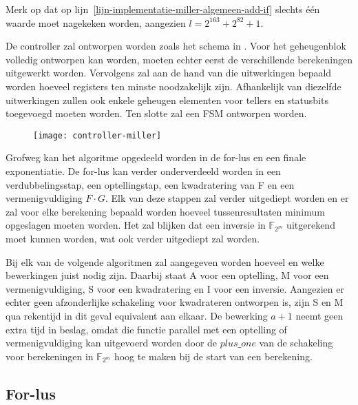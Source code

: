 Merk op dat op lijn~\ref{lijn-implementatie-miller-algemeen-add-if} slechts \'e\'en waarde moet nagekeken worden, aangezien $l = 2^{163} + 2^{82} + 1$.

De controller zal ontworpen worden zoals het schema in . Voor het geheugenblok volledig ontworpen kan worden, moeten echter eerst de verschillende berekeningen uitgewerkt worden. Vervolgens zal aan de hand van die uitwerkingen bepaald worden hoeveel registers ten minste noodzakelijk zijn. Afhankelijk van diezelfde uitwerkingen zullen ook enkele geheugen elementen voor tellers en statusbits toegevoegd moeten worden. Ten slotte zal een FSM ontworpen worden.

\begin{figure}[h]
	\centering
		\texttt{[image: controller-miller]}
		\label{figuur-implementatie-miller-controller}
\end{figure}

Grofweg kan het algoritme opgedeeld worden in de for-lus  en een finale exponentiatie. De for-lus kan verder onderverdeeld worden in een verdubbelingsstap, een optellingstap, een kwadratering van F en een vermenigvuldiging $F \cdot G$. Elk van deze stappen zal verder uitgediept worden en er zal voor elke berekening bepaald worden hoeveel tussenresultaten minimum opgeslagen moeten worden. Het zal blijken dat een inversie in $\mathbb{F}_{2^m}$ uitgerekend moet kunnen worden, wat ook verder uitgediept zal worden.

Bij elk van de volgende algoritmen zal aangegeven worden hoeveel en welke bewerkingen juist nodig zijn. Daarbij staat \textsf{A} voor een optelling, \textsf{M} voor een vermenigvuldiging, \textsf{S} voor een kwadratering en \textsf{I} voor een inversie. Aangezien er echter geen afzonderlijke schakeling voor kwadrateren ontworpen is, zijn \textsf{S} en \textsf{M} qua rekentijd in dit geval equivalent aan elkaar. De bewerking $a + 1$ neemt geen extra tijd in beslag, omdat die functie parallel met een optelling of vermenigvuldiging kan uitgevoerd worden door de $plus\_one$ van de schakeling voor berekeningen in $\mathbb{F}_{2^m}$ hoog te maken bij de start van een berekening.

\subsection{For-lus}\label{subsectie-implementatie-miller-forlus}

